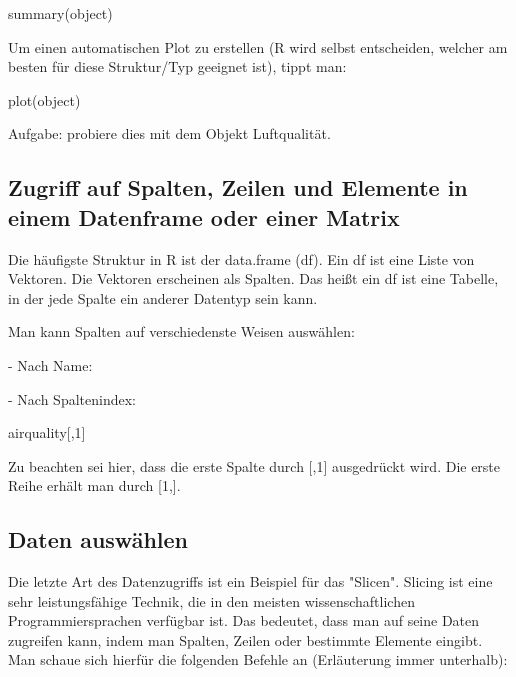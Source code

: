 \documentclass[a4paper,twoside]{tufte-book}\usepackage[]{graphicx}\usepackage[]{color}
\begin{document}
\begin{appendices}
\begin{Schunk}
\begin{Sinput}
summary(object)
\end{Sinput}
\end{Schunk}

Um einen automatischen Plot zu erstellen (R wird selbst entscheiden, welcher am besten für diese Struktur/Typ geeignet ist), tippt man:

\begin{Schunk}
\begin{Sinput}
plot(object)
\end{Sinput}
\end{Schunk}

Aufgabe: probiere dies mit dem Objekt Luftqualität.

\subsection{Zugriff auf Spalten, Zeilen und Elemente in einem Datenframe oder einer Matrix}

Die häufigste Struktur in R ist der data.frame (df). Ein df ist eine Liste von Vektoren. Die Vektoren erscheinen als Spalten. Das heißt ein df ist eine Tabelle, in der jede Spalte ein anderer Datentyp sein kann.

Man kann Spalten auf verschiedenste Weisen auswählen:

- Nach Name:
\begin{Schunk}
\end{Schunk}

- Nach Spaltenindex: 

\begin{Schunk}
\begin{Sinput}
airquality[,1]
\end{Sinput}
\end{Schunk}

Zu beachten sei hier, dass die erste Spalte durch [,1] ausgedrückt wird. Die erste Reihe erhält man durch [1,].

\subsection{Daten auswählen}

Die letzte Art des Datenzugriffs ist ein Beispiel für das "Slicen". Slicing ist eine sehr leistungsfähige Technik, die in den meisten wissenschaftlichen Programmiersprachen verfügbar ist. Das bedeutet, dass man auf seine Daten zugreifen kann, indem man Spalten, Zeilen oder bestimmte Elemente eingibt. Man schaue sich hierfür die folgenden Befehle an (Erläuterung immer unterhalb):


\end{appendices}
\end{document}
